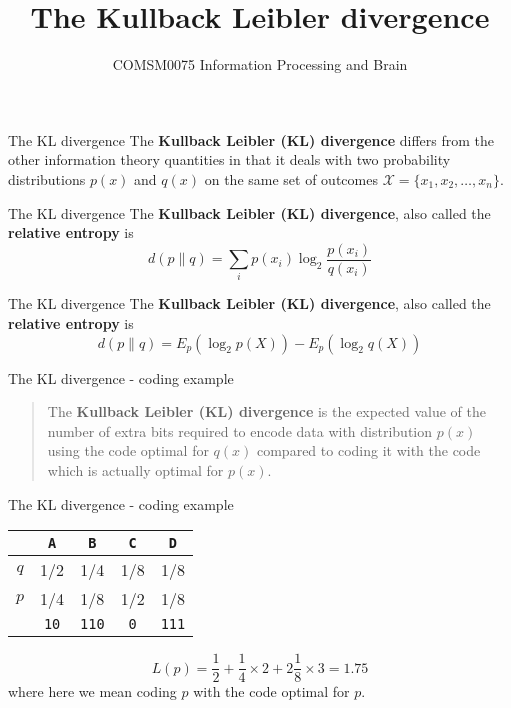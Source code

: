 \documentclass{beamer}
\title[Information Theory]{The Kullback Leibler divergence}
\author{COMSM0075 Information Processing and Brain}
\institute{\texttt{comsm0075.github.io}}
\newcommand{\crish}{\color{reddish}}
\newcommand{\cbla}{\color{black}}
\newcommand{\sm}{\color{reddish}$}
\newcommand{\fm}{$\color{black}{}}
\newcommand{\letter}[1]{\color{blue}\texttt{#1}\color{black}}
\newcommand{\binary}[1]{\color{red}\texttt{#1}\color{black}}
\begin{document}
\maketitle

\begin{frame}{The KL divergence}
  The \textbf{Kullback Leibler (KL) divergence} differs from the other
  information theory quantities in that it deals with two probability
  distributions $p(x)$ and $q(x)$ on the same set of outcomes
  \crish$\mathcal{X}=\{x_1,x_2,\ldots,x_n\}$\cbla.
\end{frame}

\begin{frame}{The KL divergence}
  The \textbf{Kullback Leibler (KL) divergence}, also called the \textbf{relative entropy} is
  \crish
  $$
  d(p\|q)=\sum_i p(x_i)\log_2{\frac{p(x_i)}{q(x_i)}}
    $$
    \cbla
\end{frame}

\begin{frame}{The KL divergence}
  The \textbf{Kullback Leibler (KL) divergence}, also called the \textbf{relative entropy} is
  \crish
  $$
  d(p\|q)=E_p(\log_2{p(X)})-E_p(\log_2{q(X)})
    $$
    \cbla
\end{frame}

\begin{frame}{The KL divergence - coding example}
\begin{quote}
  The \textbf{Kullback Leibler (KL) divergence} is the expected value
  of the number of extra bits required to encode data with
  distribution \sm{}p(x)\fm{} using the code optimal for \sm{}q(x)\fm{} compared to coding it with the code which is actually optimal for \sm{}p(x)\fm{}.
  \end{quote}
\end{frame}

\begin{frame}{The KL divergence - coding example}

\begin{center}
\begin{tabular}{c|cccc}
&\letter{A}&\letter{B}&\letter{C}&\letter{D}\\
\hline
$q$&1/2&1/4&1/8&1/8\\
$p$&1/4&1/8&1/2&1/8\\
\hline
&\binary{10}&\binary{110}&\binary{0}&\binary{111}
\end{tabular}
\end{center}
\crish
$$
L(p)=\frac{1}{2}+\frac{1}{4}\times 2 +2\frac{1}{8}\times 3=1.75
$$
\cbla
where here we mean coding \crish$p$\cbla{} with the code optimal for \sm{}p\fm{}.  
\end{frame}
\end{document}
